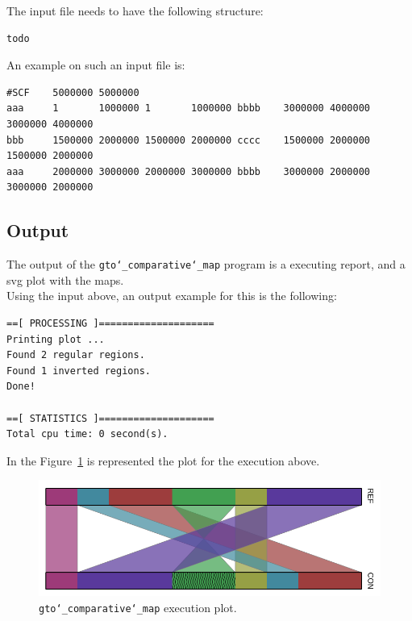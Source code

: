 The input file needs to have the following structure:
\begin{lstlisting}
todo
\end{lstlisting}
An example on such an input file is:
\begin{lstlisting}
#SCF    5000000 5000000
aaa     1       1000000 1       1000000 bbbb    3000000 4000000 3000000 4000000
bbb     1500000 2000000 1500000 2000000 cccc    1500000 2000000 1500000 2000000
aaa     2000000 3000000 2000000 3000000 bbbb    3000000 2000000 3000000 2000000
\end{lstlisting}

\subsection*{Output}
The output of the \texttt{gto\char`_comparative\char`_map} program is a executing report, and a svg plot with the maps.\\
Using the input above, an output example for this is the following:
\begin{lstlisting}
==[ PROCESSING ]====================
Printing plot ...
Found 2 regular regions. 
Found 1 inverted regions.
Done!                       

==[ STATISTICS ]====================
Total cpu time: 0 second(s).
\end{lstlisting}

In the Figure~\ref{fig:gtoComparativeMap} is represented the plot for the execution above.

 \begin{figure}[!h]
  \centering
  \includegraphics[scale=0.6]{./images/gto_comparative_map.png}
  \caption{\texttt{gto\char`_comparative\char`_map} execution plot.}
  \label{fig:gtoComparativeMap}
 \end{figure}